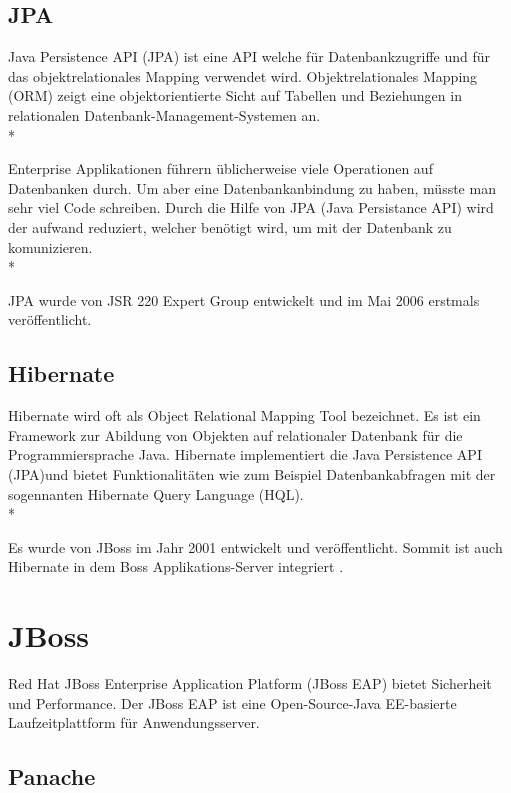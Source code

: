 \subsection{JPA}
\author{David Ignjatovic} 

Java Persistence API (JPA) ist eine API welche für Datenbankzugriffe und für das objektrelationales Mapping verwendet wird. 
Objektrelationales Mapping (ORM) zeigt eine objektorientierte Sicht auf Tabellen und Beziehungen in relationalen Datenbank-Management-Systemen an.  \\*

Enterprise Applikationen führern üblicherweise viele Operationen auf Datenbanken durch.
Um aber eine Datenbankanbindung zu haben, müsste man sehr viel Code schreiben.
Durch die Hilfe von JPA (Java Persistance API) wird der aufwand reduziert, welcher benötigt wird, um mit der Datenbank zu komunizieren. \\* \cite{JPA}

JPA wurde von JSR 220 Expert Group entwickelt und im Mai 2006 erstmals veröffentlicht. 

\subsection{Hibernate}
\author{David Ignjatovic}

Hibernate wird oft als Object Relational Mapping Tool bezeichnet. Es ist ein Framework zur Abildung von Objekten auf relationaler Datenbank für die Programmiersprache Java.
Hibernate implementiert die Java Persistence API (JPA)und bietet Funktionalitäten wie zum Beispiel  Datenbankabfragen mit der sogennanten Hibernate Query Language (HQL). \\*

Es wurde von JBoss im Jahr 2001 entwickelt und veröffentlicht. Sommit ist auch Hibernate in dem Boss Applikations-Server integriert .\cite{Hibernate}


\section{JBoss}
\author{David Ignjatovic}

Red Hat JBoss Enterprise Application Platform (JBoss EAP) bietet Sicherheit und Performance. Der JBoss EAP ist eine Open-Source-Java EE-basierte Laufzeitplattform für Anwendungsserver.


\subsection{Panache}
\author{David Ignjatovic}

